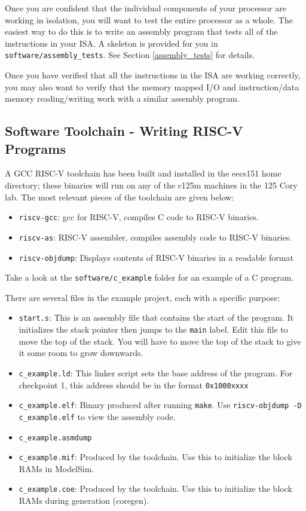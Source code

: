 \documentclass[11pt]{article}
\begin{document}
Once you are confident that the individual components of your processor are working in isolation, you will want to test the entire processor as a whole. The easiest way to do this is to write an assembly program that tests all of the instructions in your ISA. A skeleton is provided for you in \verb|software/assembly_tests|. See Section \ref{assembly_tests} for details.

Once you have verified that all the instructions in the ISA are working correctly, you may also want to verify that the memory mapped I/O and instruction/data memory reading/writing work with a similar assembly program.

\subsection{Software Toolchain - Writing RISC-V Programs}
\label{soft_append}
A GCC RISC-V toolchain has been built and installed in the eecs151 home directory; these binaries will run on any of the c125m machines in the 125 Cory lab. The most relevant pieces of the toolchain are given below:
\begin{itemize}
    \item \verb|riscv-gcc|: gcc for RISC-V, compiles C code to RISC-V binaries.
    \item \verb|riscv-as|: RISC-V assembler, compiles assembly code to RISC-V binaries.
    \item \verb|riscv-objdump|: Displays contents of RISC-V binaries in a readable format
\end{itemize}

Take a look at the \verb|software/c_example| folder for an example of a C program.

There are several files in the example project, each with a specific purpose:
\begin{itemize}
    \item \verb|start.s|: This is an assembly file that contains the start of the program. It initializes the stack pointer then jumps to the \verb|main| label. Edit this file to move the top of the stack. You will have to move the top of the stack to give it some room to grow downwards.
    \item \verb|c_example.ld|: This linker script sets the base address of the program. For checkpoint 1, this address should be in the format \verb|0x1000xxxx|
    \item \verb|c_example.elf|: Binary produced after running \verb|make|. Use \verb|riscv-objdump -D c_example.elf| to view the assembly code.
    \item \verb|c_example.asmdump|
    \item \verb|c_example.mif|: Produced by the toolchain. Use this to initialize the block RAMs in ModelSim.
    \item \verb|c_example.coe|: Produced by the toolchain. Use this to initialize the block RAMs during generation (coregen).
\end{itemize}
\end{document}

